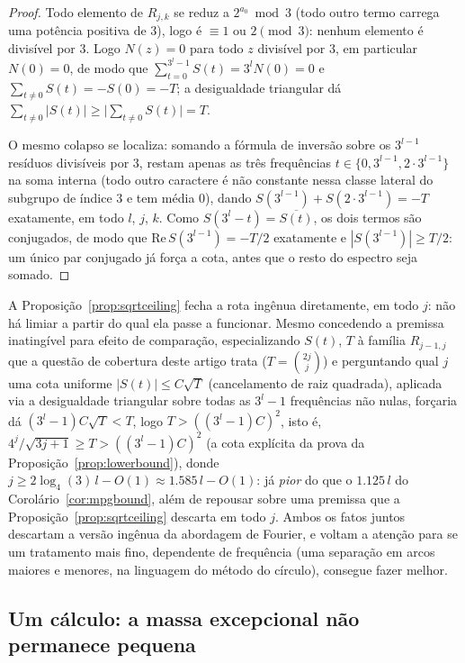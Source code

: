 \documentclass[11pt]{amsart}
\theoremstyle{plain}
\theoremstyle{definition}
\theoremstyle{remark}
\begin{document}
\begin{proof}
Todo elemento de $R_{j,k}$ se reduz a $2^{a_0}\bmod3$ (todo outro termo carrega uma potência
positiva de $3$), logo é $\equiv1$ ou $2\pmod3$: nenhum elemento é divisível por $3$. Logo $N(z)=0$
para todo $z$ divisível por $3$, em particular $N(0)=0$, de modo que $\sum_{t=0}^{3^l-1}S(t)=3^lN(0)=0$
e $\sum_{t\ne0}S(t)=-S(0)=-T$; a desigualdade triangular dá
$\sum_{t\ne0}|S(t)|\ge\bigl|\sum_{t\ne0} S(t)\bigr|=T$.

O mesmo colapso se localiza: somando a fórmula de inversão sobre os $3^{l-1}$ resíduos divisíveis
por $3$, restam apenas as três frequências $t\in\{0,3^{l-1},2\cdot3^{l-1}\}$ na soma interna (todo
outro caractere é não constante nessa classe lateral do subgrupo de índice $3$ e tem média $0$),
dando $S(3^{l-1})+S(2\cdot3^{l-1})=-T$ exatamente, em todo $l$, $j$, $k$. Como
$S(3^l-t)=\overline{S(t)}$, os dois termos são conjugados, de modo que $\mathrm{Re}\,S(3^{l-1})=-T/2$
exatamente e $|S(3^{l-1})|\ge T/2$: um único par conjugado já força a cota, antes que o resto do
espectro seja somado.
\end{proof}

A Proposição~\ref{prop:sqrtceiling} fecha a rota ingênua diretamente, em todo $j$: não há limiar a
partir do qual ela passe a funcionar. Mesmo concedendo a premissa inatingível para efeito de
comparação, especializando $S(t)$, $T$ à família $R_{j-1,j}$ que a questão de cobertura deste
artigo trata ($T=\binom{2j}{j}$) e perguntando qual $j$ uma cota uniforme $|S(t)|\le C\sqrt{T}$
(cancelamento de raiz quadrada), aplicada via a desigualdade triangular sobre todas as $3^l-1$
frequências não nulas, forçaria dá $(3^l-1)C\sqrt{T} < T$, logo $T > ((3^l-1)C)^2$, isto é,
$4^j/\sqrt{3j+1} \ge T > ((3^l-1)C)^2$ (a cota explícita da prova da
Proposição~\ref{prop:lowerbound}), donde $j \ge 2\log_4(3)\,l - O(1) \approx 1.585\,l - O(1)$: já
\emph{pior} do que o $1.125\,l$ do Corolário~\ref{cor:mpgbound}, além de repousar sobre uma
premissa que a Proposição~\ref{prop:sqrtceiling} descarta em todo $j$. Ambos os fatos juntos
descartam a versão ingênua da abordagem de Fourier, e voltam a atenção para se um tratamento mais
fino, dependente de frequência (uma separação em arcos maiores e menores, na linguagem do método
do círculo), consegue fazer melhor.

\subsection{Um cálculo: a massa excepcional não permanece pequena}
\end{document}
